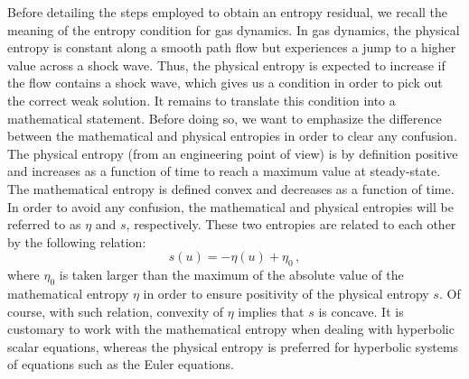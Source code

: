 Before detailing the steps employed to obtain an entropy residual, we recall the meaning of the entropy condition for gas dynamics. In gas dynamics, the physical entropy is constant along a smooth path flow but experiences a jump to a higher value across a shock wave. Thus, the physical entropy is expected to increase if the flow contains a shock wave, which gives us a condition in order to pick out the correct weak solution. It remains to translate this condition into a mathematical statement. Before doing so, we want to emphasize the difference between the mathematical and physical entropies in order to clear any confusion. The physical entropy (from an engineering point of view) is by definition positive and increases as a function of time to reach a maximum value at steady-state. The mathematical entropy is defined convex and decreases as a function of time. In order to avoid any confusion, the mathematical and physical entropies will be referred to as $\eta$ and $s$, respectively. These two entropies are related to each other by the following relation:
%
\begin{equation}
s(u) = -\eta (u) + \eta_0 \,,
\end{equation}
%  
where $\eta_0$ is taken larger than the maximum of the absolute value of the mathematical entropy $\eta$ in order to ensure positivity of the physical entropy $s$. Of course, with such relation, convexity of $\eta$ implies that $s$ is concave. It is customary to work with the mathematical entropy when dealing with hyperbolic scalar equations, whereas the physical entropy is preferred for hyperbolic systems of equations such as the Euler equations. 

